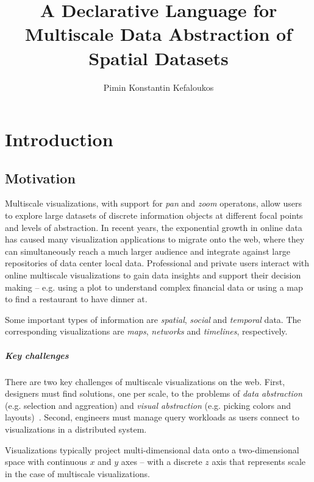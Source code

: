 \documentclass[11pt, oneside]{report}   	%
\title{A Declarative Language for Multiscale Data Abstraction of Spatial Datasets}
\author{Pimin Konstantin Kefaloukos}
\begin{document}
\maketitle

\tableofcontents

\chapter{Introduction}

\section{Motivation}
Multiscale visualizations, with support for \emph{pan} and \emph{zoom} operatons, allow users to explore large datasets of discrete information objects at different focal points and levels of abstraction. In recent years, the exponential growth in online data has caused many visualization applications to migrate onto the web, where they can simultaneously reach a much larger audience and integrate against large repositories of data center local data. Professional and private users interact with online multiscale visualizations to gain data insights and support their decision making -- e.g. using a plot to understand complex financial data or using a map to find a restaurant to have dinner at. 

Some important types of information are \emph{spatial}, \emph{social} and \emph{temporal} data. The corresponding visualizations are \emph{maps}, \emph{networks} and \emph{timelines}, respectively.

\paragraph{Key challenges}
There are two key challenges of multiscale visualizations on the web. First, designers must find solutions, one per scale, to the problems of \emph{data abstraction} (e.g. selection and aggreation) and \emph{visual abstraction} (e.g. picking colors and layouts)~\cite{stolte2003multiscale}. Second, engineers must manage query workloads as users connect to visualizations in a distributed system.

Visualizations typically project multi-dimensional data onto a two-dimensional space with continuous $x$ and $y$ axes -- with a discrete $z$ axis that represents scale in the case of multiscale visualizations. 
\end{document}
